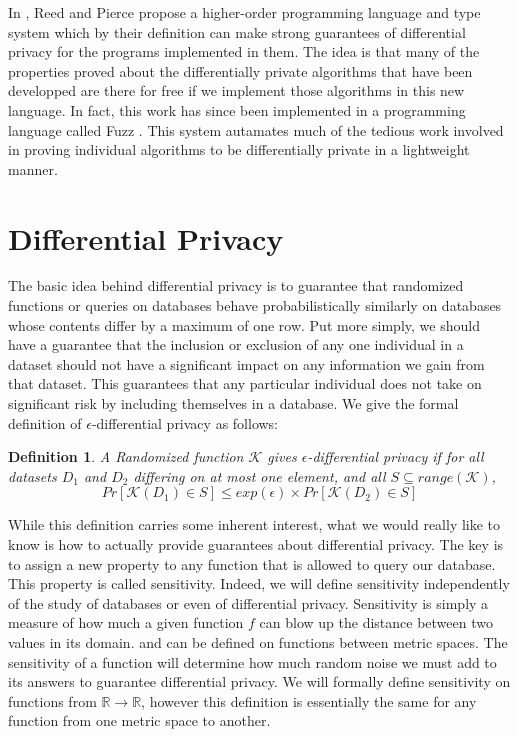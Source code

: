 \documentclass[11pt]{article}
\newtheorem{mydef}{Definition}
\begin{document}
In \cite{reed2010}, Reed and Pierce propose a higher-order programming language and type system which by their definition can make strong guarantees of differential privacy for the programs implemented in them. The idea is that many of the properties proved about the differentially private algorithms that have been developped are there for free if we implement those algorithms in this new language. In fact, this work has since been implemented in a programming language called Fuzz \cite{gaboardi2013}. This system autamates much of the tedious work involved in proving individual algorithms to be differentially private in a lightweight manner. \\


\section{Differential Privacy}

The basic idea behind differential privacy is to guarantee that randomized functions or queries on databases behave probabilistically similarly on databases whose contents differ by a maximum of one row. Put more simply, we should have a guarantee that the inclusion or exclusion of any one individual in a dataset should not have a significant impact on any information we gain from that dataset. This guarantees that any particular individual does not take on significant risk by including themselves in a database. We give the formal definition of $\epsilon$-differential privacy as follows: \\

\begin{mydef} \cite{dwork2008}
  A Randomized function $\mathcal{K}$ gives $\epsilon$-differential privacy if for all datasets $D_1$ and $D_2$ differing on at most one element, and all $S \subseteq range(\mathcal{K}) $,
  \begin{equation}
    Pr[\mathcal{K}(D_1) \in S ] \leq exp(\epsilon) \times Pr[\mathcal{K}(D_2) \in S ]
  \end{equation}
\end{mydef} 

While this definition carries some inherent interest, what we would really like to know is how to actually provide guarantees about differential privacy. The key is to assign a new property to any function that is allowed to query our database. This property is called sensitivity. Indeed, we will define sensitivity independently of the study of databases or even of differential privacy. Sensitivity is simply a measure of how much a given function $f$ can blow up the distance between two values in its domain. and can be defined on functions between metric spaces. The sensitivity of a function will determine how much random noise we must add to its answers to guarantee differential privacy. We will formally define sensitivity on functions from $\mathbb{R} \rightarrow \mathbb{R}$, however this definition is essentially the same for any function from one metric space to another\cite{reed2010}. \\
\end{document}
